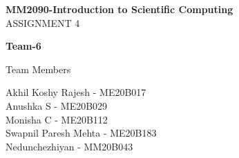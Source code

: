 \documentclass[a4paper,12pt]{article}
\begin{document}
\begin{titlepage}
    \begin{center}
        \vspace*{1cm}
        \Huge
        \textbf{MM2090-Introduction to Scientific Computing}\\
        \vspace{2cm}
        \LARGE
        ASSIGNMENT 4
        \vspace{1.5cm}
            
        \textbf{Team-6}
            
        \vfill
            
        Team Members
            
        \vspace{0.8cm}
            
        \Large
        Akhil Koshy Rajesh - ME20B017\\
        Anushka S - ME20B029\\
        Monisha C - ME20B112\\
        Swapnil Paresh Mehta - ME20B183\\
        Nedunchezhiyan - MM20B043
            
    \end{center}
\end{titlepage}

\tableofcontents
\newpage

\newpage

\newpage

\newpage

\newpage



\end{document}

